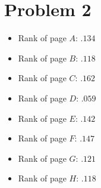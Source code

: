 \documentclass{article}
\begin{document}
\section*{Problem 2}
\begin{itemize}
    \item Rank of page $A$: $.134$
    \item Rank of page $B$: $.118$
    \item Rank of page $C$: $.162$
    \item Rank of page $D$: $.059$
    \item Rank of page $E$: $.142$
    \item Rank of page $F$: $.147$
    \item Rank of page $G$: $.121$
    \item Rank of page $H$: $.118$
\end{itemize}
\end{document}
